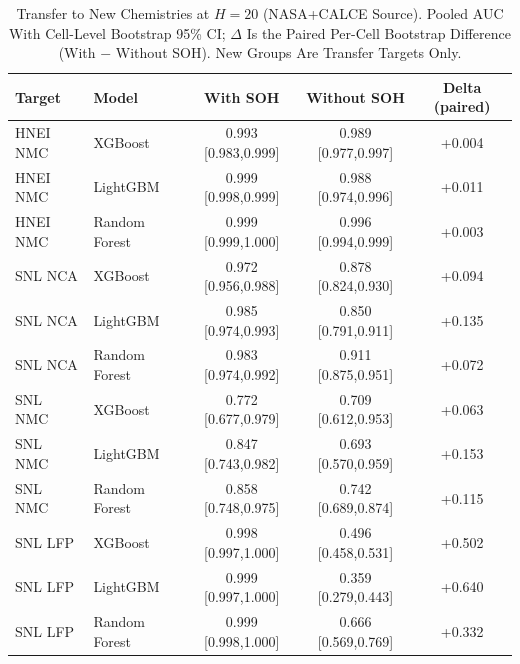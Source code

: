 \begin{table}[!t]
\caption{Transfer to New Chemistries at $H{=}20$ (NASA+CALCE Source). Pooled AUC With Cell-Level Bootstrap 95\% CI; $\Delta$ Is the Paired Per-Cell Bootstrap Difference (With $-$ Without SOH). New Groups Are Transfer Targets Only.}
\label{tab:crosschemnew}
\centering
\footnotesize
\begin{tabular}{llccc}
\toprule
\textbf{Target} & \textbf{Model} & \textbf{With SOH} & \textbf{Without SOH} & \textbf{Delta (paired)}\\
\midrule
HNEI NMC & XGBoost & 0.993 [0.983,0.999] & 0.989 [0.977,0.997] & +0.004 \\
HNEI NMC & LightGBM & 0.999 [0.998,0.999] & 0.988 [0.974,0.996] & +0.011 \\
HNEI NMC & Random Forest & 0.999 [0.999,1.000] & 0.996 [0.994,0.999] & +0.003 \\
SNL NCA & XGBoost & 0.972 [0.956,0.988] & 0.878 [0.824,0.930] & +0.094 \\
SNL NCA & LightGBM & 0.985 [0.974,0.993] & 0.850 [0.791,0.911] & +0.135 \\
SNL NCA & Random Forest & 0.983 [0.974,0.992] & 0.911 [0.875,0.951] & +0.072 \\
SNL NMC & XGBoost & 0.772 [0.677,0.979] & 0.709 [0.612,0.953] & +0.063 \\
SNL NMC & LightGBM & 0.847 [0.743,0.982] & 0.693 [0.570,0.959] & +0.153 \\
SNL NMC & Random Forest & 0.858 [0.748,0.975] & 0.742 [0.689,0.874] & +0.115 \\
SNL LFP & XGBoost & 0.998 [0.997,1.000] & 0.496 [0.458,0.531] & +0.502 \\
SNL LFP & LightGBM & 0.999 [0.997,1.000] & 0.359 [0.279,0.443] & +0.640 \\
SNL LFP & Random Forest & 0.999 [0.998,1.000] & 0.666 [0.569,0.769] & +0.332 \\
\bottomrule
\end{tabular}
\end{table}


